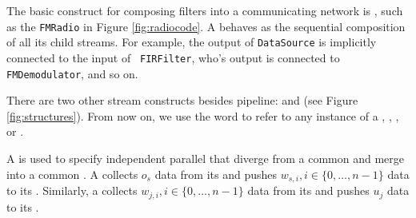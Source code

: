 


The basic construct for composing filters into a communicating
network is \pipeline, such as the {\tt FMRadio} in Figure
\ref{fig:radiocode}.  A \pipeline behaves as the sequential
composition of all its child streams.  For example, the output of
{\tt DataSource} is implicitly connected to the input of {\tt
FIRFilter}, who's output is connected to {\tt FMDemodulator}, and
so on.

There are two other stream constructs besides pipeline: \splitjoin
and \feedbackloop (see Figure \ref{fig:structures}). From now on,
we use the word \stream to refer to any instance of a \filter,
\pipeline, \splitjoin, or \feedbackloop.

A \splitjoin is used to specify independent parallel \streams that
diverge from a common {\splitter} and merge into a common
{\joiner}. A \splitter collects $o_s$ data from its \Input
\Channel and pushes $w_{s,i}, i \in \{0,\dots,n-1\}$ data to its
\Output \Channels. Similarly, a \joiner collects $w_{j,i}, i \in
\{0,\dots,n-1\}$ data from its \Input \Channel and pushes $u_j$
data to its \Output \Channel.

\begin{comment}
There are two kinds of \splitters: 1) \duplicate, which replicates
each data item and sends a copy to each parallel \stream, and 2)
\roundrobin$(w_0, \dots, w_{n-1})$, which sends the first $w_0$
items to the first \stream, the next $w_1$ items to the second
\stream, and so on.  \roundrobin is also the only type of \joiner
that we support; its function is analogous to a \roundrobin
\splitter.  If a \roundrobin is written without any weights, we
assume that all $w_i = 1$. The \splitter and \joiner type are
specified with the keywords {\tt split} and {\tt join},
respectively (see Figure \ref{fig:radiocode}); the parallel
streams are specified by successive calls to {\tt add}, with the
$i$'th call setting the $i$'th stream in the splitjoin.
\end{comment}

